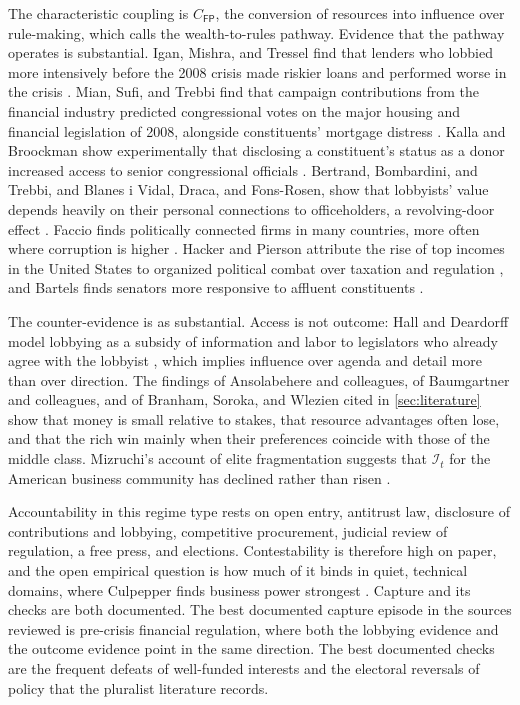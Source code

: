 \documentclass[11pt,letterpaper]{article}
\theoremstyle{definition}
\theoremstyle{remark}
\newcommand{\pF}{\mathsf{F}}
\newcommand{\pP}{\mathsf{P}}
\newcommand{\Integ}{\mathcal{I}}
\begin{document}
The characteristic coupling is $C_{\pF\pP}$, the conversion of resources into influence over rule-making, which \citet{largo2026hbs} calls the wealth-to-rules pathway. Evidence that the pathway operates is substantial. Igan, Mishra, and Tressel find that lenders who lobbied more intensively before the 2008 crisis made riskier loans and performed worse in the crisis \citep{igan2012}. Mian, Sufi, and Trebbi find that campaign contributions from the financial industry predicted congressional votes on the major housing and financial legislation of 2008, alongside constituents' mortgage distress \citep{mian2010}. Kalla and Broockman show experimentally that disclosing a constituent's status as a donor increased access to senior congressional officials \citep{kalla2016}. Bertrand, Bombardini, and Trebbi, and Blanes i Vidal, Draca, and Fons-Rosen, show that lobbyists' value depends heavily on their personal connections to officeholders, a revolving-door effect \citep{bertrand2014,blanes2012}. Faccio finds politically connected firms in many countries, more often where corruption is higher \citep{faccio2006}. Hacker and Pierson attribute the rise of top incomes in the United States to organized political combat over taxation and regulation \citep{hackerpierson2010}, and Bartels finds senators more responsive to affluent constituents \citep{bartels2008}.

The counter-evidence is as substantial. Access is not outcome: Hall and Deardorff model lobbying as a subsidy of information and labor to legislators who already agree with the lobbyist \citep{hall2006}, which implies influence over agenda and detail more than over direction. The findings of Ansolabehere and colleagues, of Baumgartner and colleagues, and of Branham, Soroka, and Wlezien cited in \cref{sec:literature} show that money is small relative to stakes, that resource advantages often lose, and that the rich win mainly when their preferences coincide with those of the middle class. Mizruchi's account of elite fragmentation suggests that $\Integ_t$ for the American business community has declined rather than risen \citep{mizruchi2013}.

Accountability in this regime type rests on open entry, antitrust law, disclosure of contributions and lobbying, competitive procurement, judicial review of regulation, a free press, and elections. Contestability is therefore high on paper, and the open empirical question is how much of it binds in quiet, technical domains, where Culpepper finds business power strongest \citep{culpepper2010}. Capture and its checks are both documented. The best documented capture episode in the sources reviewed is pre-crisis financial regulation, where both the lobbying evidence and the outcome evidence point in the same direction. The best documented checks are the frequent defeats of well-funded interests and the electoral reversals of policy that the pluralist literature records.
\end{document}
